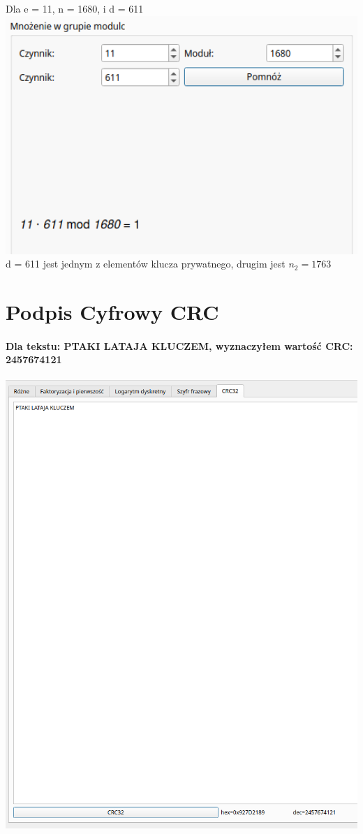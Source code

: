 \documentclass{article}[12pt]
\begin{document}
Dla e = 11, n = 1680, i d = 611 \\
\includegraphics[width=1\textwidth]{eighteen.png} \\ 
d = 611 jest jednym z elementów klucza prywatnego, drugim jest $n_2 = 1763$
\section{Podpis Cyfrowy CRC}
\paragraph{Dla tekstu: PTAKI LATAJA KLUCZEM, wyznaczyłem wartość CRC: 2457674121 \\}
\includegraphics[width=1\textwidth]{nineteen.png} 
\end{document}
